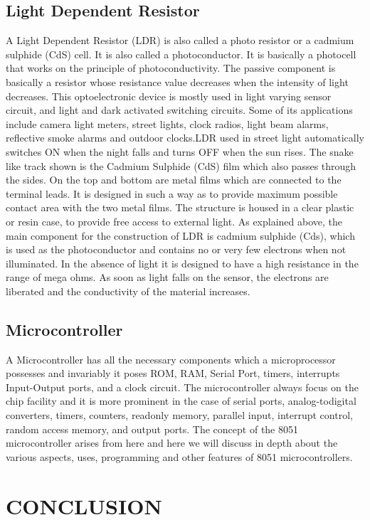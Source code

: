 \documentclass[conference]{IEEEtran}
\begin{document}
\subsection{Light Dependent Resistor}\label{AA}
A Light Dependent Resistor (LDR) is also called a
photo resistor or a cadmium sulphide (CdS) cell. It is
also called a photoconductor. It is basically a
photocell that works on the principle of
photoconductivity. The passive component is
basically a resistor whose resistance value decreases
when the intensity of light decreases.
This optoelectronic device is mostly used in light
varying sensor circuit, and light and dark activated
switching circuits. Some of its applications include
camera light meters, street lights, clock radios, light
beam alarms, reflective smoke alarms and outdoor
clocks.LDR used in street light automatically switches
ON when the night falls and turns OFF when the sun
rises. The snake like track shown is the Cadmium
Sulphide (CdS) film which also passes through the
sides. On the top and bottom are metal films which are
connected to the terminal leads. It is designed in such
a way as to provide maximum possible contact area
with the two metal films. The structure is housed in a
clear plastic or resin case, to provide free access to
external light. As explained above, the main
component for the construction of LDR is cadmium
sulphide (Cds), which is used as the photoconductor
and contains no or very few electrons when not
illuminated. In the absence of light it is designed to
have a high resistance in the range of mega ohms. As
soon as light falls on the sensor, the electrons are
liberated and the conductivity of the material
increases.

\subsection{Microcontroller}
A Microcontroller has all the necessary components
which a microprocessor possesses and invariably it
poses ROM, RAM, Serial Port, timers, interrupts
Input-Output ports, and a clock circuit. The
microcontroller always focus on the chip facility and
it is more prominent in the case of serial ports,
analog-todigital converters, timers, counters, readonly memory, parallel input, interrupt control,
random access memory, and output ports. The
concept of the 8051 microcontroller arises from here
and here we will discuss in depth about the various
aspects, uses, programming and other features of 8051
microcontrollers. 

\section{CONCLUSION}
\end{document}
